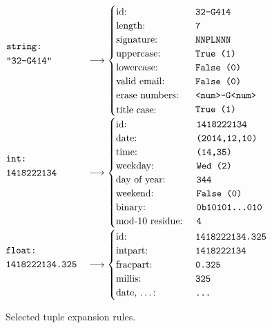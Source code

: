 \newenvironment{stackedlines}{\renewcommand{\arraystretch}{1.2}\begin{array}[b]{@{}l@{\quad}l@{}}}{\end{array}}

\begin{figure}[H]
  $\begin{stackedlines}
    \texttt{string:}\\
    \texttt{\parbox{\widthof{1418222134.325}}{"32-G414"}}
  \end{stackedlines} \longrightarrow
  \begin{cases}
    \text{id: } & \texttt{32-G414}\\
    \text{length: } & \texttt{7}\\
    \text{signature: } & \texttt{NNPLNNN}\\
    \text{uppercase: } & \texttt{True (1)}\\
    \text{lowercase: } & \texttt{False (0)}\\
    \text{valid email: } & \texttt{False (0)}\\
    \text{erase numbers: } & \texttt{<num>-G<num>}\\
    \text{\parbox{\widthof{base-10 residue:}}{title case:} } & \texttt{True (1)}
  \end{cases}$
  $\begin{stackedlines}
    \texttt{int:}\\
    \texttt{\parbox{\widthof{1418222134.325}}{1418222134}}
  \end{stackedlines} \longrightarrow
  \begin{cases}
    \text{id: } & \texttt{1418222134}\\
    \text{date: } & \texttt{(2014,12,10)}\\
    \text{time: } & \texttt{(14,35)}\\
    \text{weekday: } & \texttt{Wed (2)}\\
    \text{day of year: } & \texttt{344}\\
    \text{weekend: } & \texttt{False (0)}\\
    \text{binary: } & \texttt{0b10101\ldots010}\\
    \text{mod-10 residue: } & \texttt{4}
  \end{cases}$
   $\begin{stackedlines}
    \texttt{float:}\\
    \texttt{1418222134.325}
  \end{stackedlines} \longrightarrow
  \begin{cases}
    \text{id: } & \texttt{1418222134.325}\\
    \text{intpart: } & \texttt{1418222134}\\
    \text{fracpart: } & \texttt{0.325}\\
    \text{millis: } & \texttt{325}\\
    \text{\parbox{\widthof{base-10 residue:}}{date, \ldots:} } & \texttt{\ldots}
  \end{cases}$

  \caption{Selected tuple expansion rules.}
  \label{fig:tuple-expansion}
\end{figure}